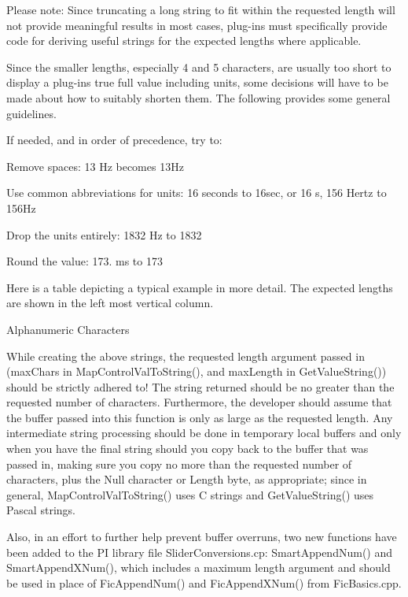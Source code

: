 Please note\+: Since truncating a long string to fit within the requested length will not provide meaningful results in most cases, plug-\/ins must specifically provide code for deriving useful strings for the expected lengths where applicable.

Since the smaller lengths, especially 4 and 5 characters, are usually too short to display a plug-\/in\textquotesingle{}s true full value including units, some decisions will have to be made about how to suitably shorten them. The following provides some general guidelines.

If needed, and in order of precedence, try to\+: 
\begin{DoxyItemize}
\item Remove spaces\+: 13 Hz becomes 13\+Hz 
\item Use common abbreviations for units\+: 16 seconds to 16sec, or 16 s, 156 Hertz to 156\+Hz  
\item Drop the units entirely\+: 1832 Hz to 1832 
\item Round the value\+: 173. ms to 173 
\end{DoxyItemize}

Here is a table depicting a typical example in more detail. The expected lengths are shown in the left most vertical column.

  Alphanumeric Characters

While creating the above strings, the requested length argument passed in (max\+Chars in Map\+Control\+Val\+To\+String(), and max\+Length in Get\+Value\+String()) should be strictly adhered to! The string returned should be no greater than the requested number of characters. Furthermore, the developer should assume that the buffer passed into this function is only as large as the requested length. Any intermediate string processing should be done in temporary local buffers and only when you have the final string should you copy back to the buffer that was passed in, making sure you copy no more than the requested number of characters, plus the Null character or Length byte, as appropriate; since in general, Map\+Control\+Val\+To\+String() uses C strings and Get\+Value\+String() uses Pascal strings.

Also, in an effort to further help prevent buffer overruns, two new functions have been added to the P\+I library file Slider\+Conversions.\+cp\+: Smart\+Append\+Num() and Smart\+Append\+X\+Num(), which includes a maximum length argument and should be used in place of Fic\+Append\+Num() and Fic\+Append\+X\+Num() from Fic\+Basics.\+cpp.

